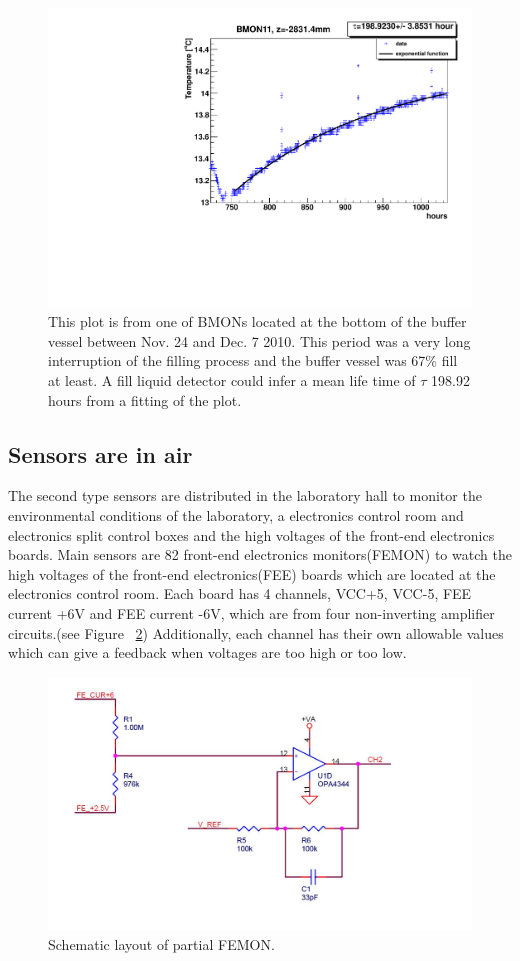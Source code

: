 \documentclass{JINST}
\begin{document}
\begin{figure}
\centering
\includegraphics[width=.6\textwidth]{BMONtemp11.pdf}
\caption{This plot is from one of BMONs located at the bottom of the buffer vessel between Nov. 24 and Dec. 7 2010. This period was a very long interruption of the filling process and the buffer vessel was 67\% fill at least. A fill liquid detector could infer a mean life time of $\tau$ 198.92 hours from a fitting of the plot.}
\label{fig8}
\end{figure}

\subsection{Sensors are in air}
The second type sensors are distributed in the laboratory hall to monitor the environmental conditions of the laboratory, a electronics control room and electronics split control boxes and the high voltages of the front-end electronics boards. Main sensors are 82 front-end electronics monitors(FEMON) to watch the high voltages of the front-end electronics(FEE) boards which are located at the electronics control room. Each board has 4 channels, VCC+5, VCC-5, FEE current +6V and FEE current -6V, which are from four non-inverting amplifier circuits.(see Figure ~\ref{fig9}) Additionally, each channel has their own allowable values which can give a feedback when voltages are too high or too low.
 \begin{figure}
\centering
\includegraphics[width=.6\textwidth]{FEMONcir.jpg}
\caption{Schematic layout of partial FEMON.}
\label{fig9}
\end{figure}
\end{document}
